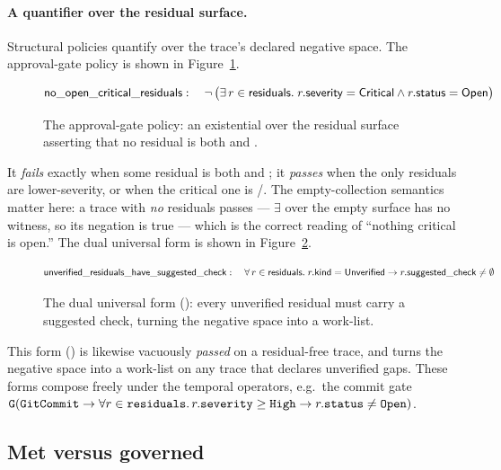 \paragraph{A quantifier over the residual surface.}
Structural policies quantify over the trace's declared negative space. The
approval-gate policy  is shown in
Figure~\ref{fig:pol-critical}.
\begin{figure}[H]
\centering
\small
\[ \mathsf{no\_open\_critical\_residuals}:\quad
\lnot\,\big(\exists\, r \in \mathsf{residuals}.\; r.\mathsf{severity} = \mathsf{Critical} \land r.\mathsf{status} = \mathsf{Open}\big) \]
\caption{The  approval-gate policy: an existential over the residual surface asserting that no residual is both  and .}
\label{fig:pol-critical}
\end{figure}
It \emph{fails} exactly when some residual is both  and
; it \emph{passes} when the only residuals are lower-severity, or when
the critical one is /. The empty-collection
semantics matter here: a trace with \emph{no} residuals passes --- \(\exists\)
over the empty surface has no witness, so its negation is true --- which is the
correct reading of ``nothing critical is open.'' The dual universal form is shown
in Figure~\ref{fig:pol-universal}.
\begin{figure}[H]
\centering
\small
\[ \mathsf{unverified\_residuals\_have\_suggested\_check}:\quad
\forall\, r \in \mathsf{residuals}.\; r.\mathsf{kind} = \mathsf{Unverified} \rightarrow r.\mathsf{suggested\_check} \neq \emptyset \]
\caption{The dual universal form (): every unverified residual must carry a suggested check, turning the negative space into a work-list.}
\label{fig:pol-universal}
\end{figure}
This form () is likewise vacuously
\emph{passed} on a residual-free trace, and turns the negative space into a
work-list on any trace that declares unverified gaps. These forms compose freely
under the temporal operators, e.g.\ the commit gate
\(\code{G}(\code{GitCommit} \to \forall r \in \code{residuals}.\,
r.\code{severity} \ge \code{High} \to r.\code{status} \neq \code{Open})\).

\subsection{Met versus governed}\label{sec:pol-met-vs-governed}

